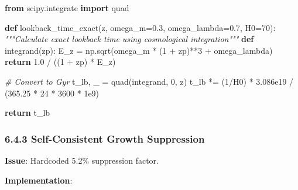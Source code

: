 \documentclass[
  11pt,
]{report}
\newenvironment{Shaded}{}{}
\newcommand{\CommentTok}[1]{\textcolor[rgb]{0.38,0.63,0.69}{\textit{#1}}}
\newcommand{\ControlFlowTok}[1]{\textcolor[rgb]{0.00,0.44,0.13}{\textbf{#1}}}
\newcommand{\DecValTok}[1]{\textcolor[rgb]{0.25,0.63,0.44}{#1}}
\newcommand{\FloatTok}[1]{\textcolor[rgb]{0.25,0.63,0.44}{#1}}
\newcommand{\ImportTok}[1]{\textcolor[rgb]{0.00,0.50,0.00}{\textbf{#1}}}
\newcommand{\KeywordTok}[1]{\textcolor[rgb]{0.00,0.44,0.13}{\textbf{#1}}}
\newcommand{\NormalTok}[1]{#1}
\newcommand{\OperatorTok}[1]{\textcolor[rgb]{0.40,0.40,0.40}{#1}}
\begin{document}
\begin{Shaded}
\begin{Highlighting}[]
\ImportTok{from}\NormalTok{ scipy.integrate }\ImportTok{import}\NormalTok{ quad}

\KeywordTok{def}\NormalTok{ lookback\_time\_exact(z, omega\_m}\OperatorTok{=}\FloatTok{0.3}\NormalTok{, omega\_lambda}\OperatorTok{=}\FloatTok{0.7}\NormalTok{, H0}\OperatorTok{=}\DecValTok{70}\NormalTok{):}
    \CommentTok{"""Calculate exact lookback time using cosmological integration"""}
    \KeywordTok{def}\NormalTok{ integrand(zp):}
\NormalTok{        E\_z }\OperatorTok{=}\NormalTok{ np.sqrt(omega\_m }\OperatorTok{*}\NormalTok{ (}\DecValTok{1} \OperatorTok{+}\NormalTok{ zp)}\OperatorTok{**}\DecValTok{3} \OperatorTok{+}\NormalTok{ omega\_lambda)}
        \ControlFlowTok{return} \FloatTok{1.0} \OperatorTok{/}\NormalTok{ ((}\DecValTok{1} \OperatorTok{+}\NormalTok{ zp) }\OperatorTok{*}\NormalTok{ E\_z)}
    
    \CommentTok{\# Convert to Gyr}
\NormalTok{    t\_lb, \_ }\OperatorTok{=}\NormalTok{ quad(integrand, }\DecValTok{0}\NormalTok{, z)}
\NormalTok{    t\_lb }\OperatorTok{*=}\NormalTok{ (}\DecValTok{1}\OperatorTok{/}\NormalTok{H0) }\OperatorTok{*} \FloatTok{3.086e19} \OperatorTok{/}\NormalTok{ (}\FloatTok{365.25} \OperatorTok{*} \DecValTok{24} \OperatorTok{*} \DecValTok{3600} \OperatorTok{*} \FloatTok{1e9}\NormalTok{)}
    
    \ControlFlowTok{return}\NormalTok{ t\_lb}
\end{Highlighting}
\end{Shaded}

\subsubsection{6.4.3 Self-Consistent Growth
Suppression}\label{self-consistent-growth-suppression}

\textbf{Issue}: Hardcoded 5.2\% suppression factor.

\textbf{Implementation}:
\end{document}
